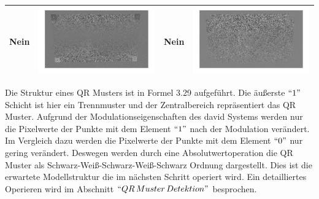 \begin{table}[htb]
\begin{tabular}{|p{2cm}<{\centering}|c|p{2cm}<{\centering}|c|}
	Nein & \includegraphics[scale=0.15]{images/3_Ersteverfahren/Differenzbild/4halbschwaryhalbweis.pdf}& Nein & \includegraphics[scale=0.15]{images/3_Ersteverfahren/Differenzbild/5aufheben.pdf}\\

	\bottomrule
	\end{tabular}
\end{table} 


Die Struktur eines QR Musters ist in Formel 3.29 aufgeführt. Die äußerste $``1"$ Schicht ist hier ein Trennmuster und der Zentralbereich repräsentiert das QR Muster. Aufgrund der Modulationseigenschaften des \gls{david} Systems werden nur die Pixelwerte der Punkte mit dem Element $``1"$ nach der Modulation verändert. Im Vergleich dazu werden die Pixelwerte der Punkte mit dem Element $``0"$ nur gering verändert. Deswegen werden durch eine Absolutwertoperation die QR Muster als Schwarz-Weiß-Schwarz-Weiß-Schwarz Ordnung dargestellt. Dies ist die erwartete Modellstruktur die im nächsten Schritt operiert wird. Ein detailliertes Operieren wird im Abschnitt $ ``QR\,Muster\,Detektion" $ besprochen.

